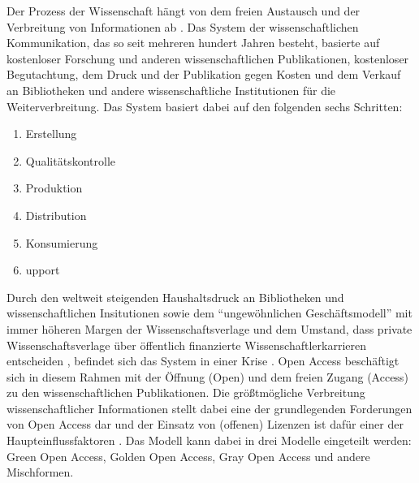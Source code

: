 Der Prozess der Wissenschaft hängt von dem freien Austausch und der Verbreitung von Informationen ab . Das System der wissenschaftlichen Kommunikation, das so seit mehreren hundert Jahren besteht, basierte auf kostenloser Forschung und anderen wissenschaftlichen Publikationen, kostenloser Begutachtung, dem Druck und der Publikation gegen Kosten und dem Verkauf an Bibliotheken und andere wissenschaftliche Institutionen für die Weiterverbreitung. Das System basiert dabei auf den folgenden sechs Schritten:
\begin{enumerate}
\item Erstellung
\item Qualitätskontrolle
\item Produktion
\item Distribution
\item Konsumierung
\item upport
\end{enumerate}
Durch den weltweit steigenden Haushaltsdruck an Bibliotheken und wissenschaftlichen Insitutionen sowie dem “ungewöhnlichen Geschäftsmodell”  mit immer höheren Margen der Wissenschaftsverlage und dem Umstand, dass private Wissenschaftsverlage über öffentlich finanzierte Wissenschaftlerkarrieren entscheiden , befindet sich das System in einer Krise . Open Access beschäftigt sich in diesem Rahmen mit der Öffnung (Open) und dem freien Zugang (Access) zu den wissenschaftlichen Publikationen. Die größtmögliche Verbreitung wissenschaftlicher Informationen stellt dabei eine der grundlegenden Forderungen von Open Access dar  und der Einsatz von (offenen) Lizenzen ist dafür einer der Haupteinflussfaktoren . Das Modell kann dabei in drei Modelle eingeteilt werden: Green Open Access, Golden Open Access, Gray Open Access und andere Mischformen.
